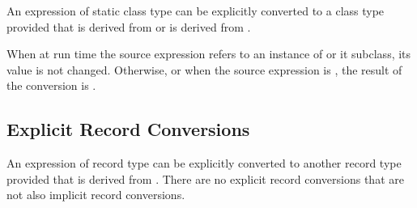 An expression of static class type  can be explicitly
converted to a class type  provided that  is derived
from  or  is derived from .

When at run time the source expression refers to an instance of
 or it subclass, its value is not changed.
Otherwise, or when the source expression is ,
the result of the conversion is .

\subsection{Explicit Record Conversions}
\label{Explicit_Record_Conversions}

An expression of record type  can be explicitly converted to
another record type  provided that  is derived
from .  There are no explicit record conversions that are not
also implicit record conversions.
